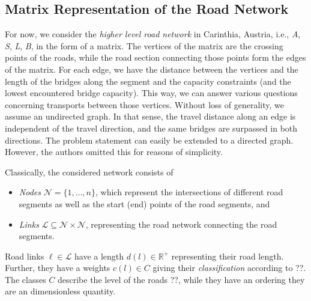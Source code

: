 %
\subsection{Matrix Representation of the Road Network}

For now, we consider the \textit{higher level road network} in Carinthia, Austria,
i.e., \textit{A}, \textit{S}, \textit{L}, \textit{B}, in the  form of a matrix.
The vertices of the matrix are the crossing points of the roads, while
the road section connecting those points form the edges of the matrix.
For each edge, we have the distance between the vertices and the length of the bridges along the segment
and the capacity constraints (and the lowest encountered bridge capacity).
This way, we can answer various questions concerning transports between those vertices.
Without loss of generality, we assume an undirected graph.
In that sense, the travel distance along an edge is independent of
the travel direction, and  the same bridges are surpassed in both directions.
The problem statement can
easily be extended to a directed graph. However, the authors omitted this for reasons of simplicity.

Classically,  the considered network consists of
\begin{itemize}
  \item \emph{Nodes} $\mathcal{N}=\{1,\ldots, n\}$, which represent the intersections of different road segments as
  well as the start (end) points of the road segments, and

  \item \emph{Links} $\mathcal{L} \subseteq \mathcal{N} \times \mathcal{N}$,
  representing the road network connecting the road segments.
\end{itemize}

Road links $\ell \in \mathcal{L}$ have a length $d(l)\in \mathbb{R}^{+}$ representing their road length.
Further, they have a weights $c(l) \in C$ giving their \emph{classification} according to {\color{red} ??}.
The classes $C$ describe the level of the roads {\color{red} ??},
while they have an ordering they are an dimensionless quantity.

